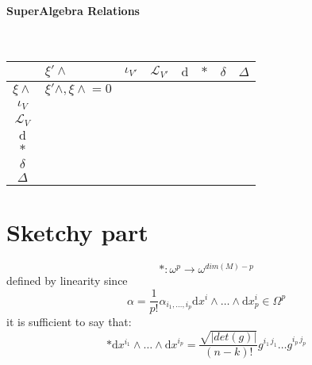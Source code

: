 \documentclass[a4paper,12pt]{scrartcl}
\renewcommand{\d}{\textrm{d}}
\providecommand{\codiff}{\delta}
\providecommand{\laplacian}{\Delta}
\providecommand{\Lie}{\mathcal{L}}%
\begin{document}
\begin{landscape}
    \paragraph{SuperAlgebra Relations}
    	\mbox{}\\
    \begin{tabularx}{\linewidth}{|c|X|X|X|X|X|X|c|}
      \hline
     	  & $\xi' \wedge$ & $\iota_{V'}$ & $\Lie_{V'} $ & $\d$ & $\ast$ & $ \codiff$ & $ \laplacian$ \\
      \hline
      	$\xi \wedge$ & ${\xi' \wedge , \xi \wedge} = 0$ &
      						& & & & & \\
      	$\iota_{V}$ & & & & & & & \\
      	$\Lie_{V} $ & & & & & & & \\
      	$\d$ & & & & & & & \\
      	$\ast$ & & & & & & & \\
      	$ \codiff$ & & & & & & & \\
      	$ \laplacian$ & & & & & & &\\
      \hline
    \end{tabularx}

  
  \end{landscape}
  
  \section{Sketchy part}
  	$$\ast : \omega^p \rightarrow  \omega^{dim(M)-p}$$
  	defined by linearity since
  	$$ \alpha = \frac{1}{p!} \alpha_{i_1,\ldots,i_p} \d x^i \wedge \ldots \wedge \d x^i_p \in \Omega^p $$
  	it is sufficient to say that:
  	$$ \ast \d x^{i_1} \wedge \ldots \wedge \d x^{i_p} =
  		\frac{\sqrt{| det(g) |}}{(n-k)!} g^{i_1 \, j_1} \ldots g^{i_p \, j_p} 
  	$$
\end{document}
